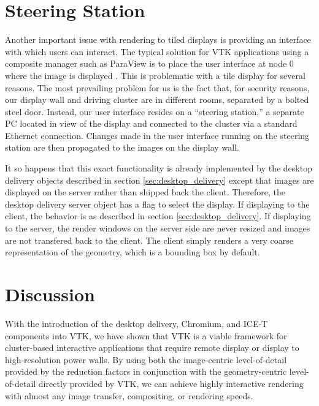 \documentclass{acmsiggraph}
\newcommand{\sticky}[1]{}
\begin{document}
  \section{Steering Station}
  \label{sec:steering_station}

  Another important issue with rendering to tiled displays is providing an
  interface with which users can interact.  The typical solution for VTK
  applications using a composite manager such as ParaView is to place the
  user interface at node 0 where the image is displayed \cite{Law01}.  This
  is problematic with a tile display for several reasons.  The most
  prevailing problem for us is the fact that, for security reasons, our
  display wall and driving cluster are in different rooms, separated by a
  bolted steel door.  Instead, our user interface resides on a ``steering
  station,'' a separate PC located in view of the display and connected to
  the cluster via a standard Ethernet connection.  Changes made in the user
  interface running on the steering station are then propagated to the
  images on the display wall.

  It so happens that this exact functionality is already implemented by the
  desktop delivery objects described in section \ref{sec:desktop_delivery}
  except that images are displayed on the server rather than shipped back
  the client.  Therefore, the desktop delivery server object has a flag to
  select the display.  If displaying to the client, the behavior is as
  described in section \ref{sec:desktop_delivery}.  If displaying to the
  server, the render windows on the server side are never resized and
  images are not transfered back to the client.  The client simply renders
  a very coarse representation of the geometry, which is a bounding box by
  default.


  \section{Discussion}
  \label{sec:discussion}

  With the introduction of the desktop delivery, Chromium, and ICE-T
  components into VTK, we have shown that VTK is a viable framework for
  cluster-based interactive applications that require remote display or
  display to high-resolution power walls.  By using both the image-centric
  level-of-detail provided by the reduction factors in conjunction with the
  geometry-centric level-of-detail directly provided by VTK, we can achieve
  highly interactive rendering with almost any image transfer, compositing,
  or rendering speeds.  \sticky{Some empirical evidence, i.e. with LLNL
  data, would probably be good here.  But how?  You really need a video and
  see it in action.}
\end{document}
